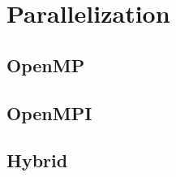 \section{Parallelization}\label{sec:parallelization}
\subsection{OpenMP}
\subsection{OpenMPI}
\subsection{Hybrid}
